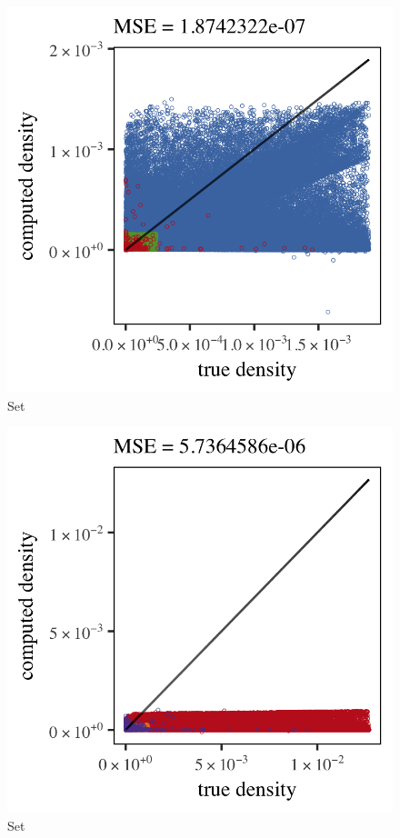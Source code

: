\begin{subfigure}{0.3\textwidth}
	\centering
	\includegraphics[keepaspectratio=true, width=\textwidth, height=0.23\textheight]{4/img/results_baakman_2_600000_sambe_breiman}
	\caption{Set \baakmanTwo}
	\label{fig:4:simulated:datasets:sambe:baakman2}
\end{subfigure}	
\begin{subfigure}{0.3\textwidth}
	\centering
	\includegraphics[keepaspectratio=true, width=\textwidth, height=0.23\textheight]{4/img/results_baakman_3_1200000_sambe_breiman}
	\caption{Set \baakmanThree}
	\label{fig:4:simulated:datasets:sambe:baakman3}
\end{subfigure}			
